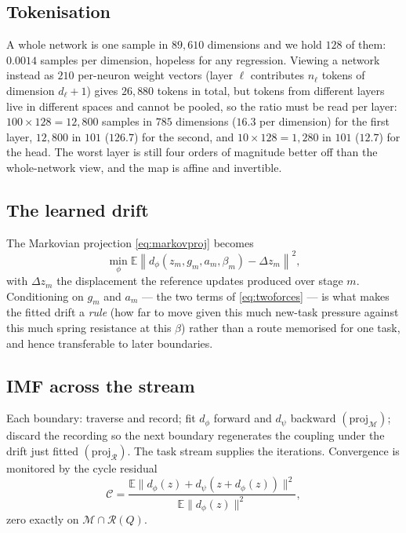 \documentclass[11pt]{article}
\theoremstyle{definition}
\theoremstyle{plain}
\theoremstyle{remark}
\newcommand{\Eb}{\mathbb{E}}
\newcommand{\Mcal}{\mathcal{M}}
\newcommand{\Rcal}{\mathcal{R}}
\newcommand{\proj}{\mathrm{proj}}
\begin{document}
\subsection{Tokenisation}

A whole network is one sample in $89{,}610$ dimensions and we hold $128$ of
them: $0.0014$ samples per dimension, hopeless for any regression. Viewing a
network instead as $210$ per-neuron weight vectors (layer $\ell$ contributes
$n_\ell$ tokens of dimension $d_\ell+1$) gives $26{,}880$ tokens in total, but
tokens from different layers live in different spaces and cannot be pooled, so
the ratio must be read per layer: $100\times128 = 12{,}800$ samples in $785$
dimensions ($16.3$ per dimension) for the first layer, $12{,}800$ in $101$
($126.7$) for the second, and $10\times128 = 1{,}280$ in $101$ ($12.7$) for the
head. The worst layer is still four orders of magnitude better off than the
whole-network view, and the map is affine and invertible.

\subsection{The learned drift}

The Markovian projection \eqref{eq:markovproj} becomes
\begin{equation}
\min_\phi \Eb \left\lVert d_\phi(z_m, g_m, a_m, \beta_m) - \Delta z_m \right\rVert^2 ,
\end{equation}
with $\Delta z_m$ the displacement the reference updates produced over stage
$m$. Conditioning on $g_m$ and $a_m$ --- the two terms of \eqref{eq:twoforces}
--- is what makes the fitted drift a \emph{rule} (how far to move given this
much new-task pressure against this much spring resistance at this $\beta$)
rather than a route memorised for one task, and hence transferable to later
boundaries.

\subsection{IMF across the stream}

Each boundary: traverse and record; fit $d_\phi$ forward and $d_\psi$ backward
$(\proj_\Mcal)$; discard the recording so the next boundary regenerates the
coupling under the drift just fitted $(\proj_\Rcal)$. The task stream supplies
the iterations. Convergence is monitored by the cycle residual
\begin{equation}
\mathcal{C} = \frac{\Eb\lVert d_\phi(z) + d_\psi(z + d_\phi(z))\rVert^2}{\Eb\lVert d_\phi(z)\rVert^2},
\end{equation}
zero exactly on $\Mcal \cap \Rcal(Q)$.
\end{document}
